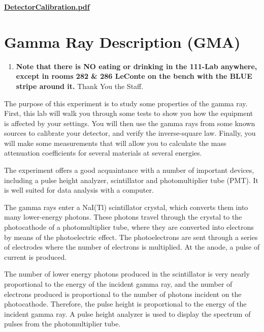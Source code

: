 \documentclass{../lab}
\begin{document}
\maketitle

\tableofcontents

\vspace{1em}

\href{http://experimentationlab.berkeley.edu/sites/default/files/images/DetectorCalibration.pdf}{\textbf{DetectorCalibration.pdf}}

\section{Gamma Ray Description (GMA)}

\begin{enumerate}
    \item \textbf{Note that there is NO eating or drinking in the 111-Lab anywhere, except in rooms 282 \& 286 LeConte on the bench with the BLUE stripe around it.} Thank You the Staff.
\end{enumerate}

The purpose of this experiment is to study some properties of the gamma ray. First, this lab will walk you through some tests to show you how the equipment is affected by your settings. You will then use the gamma rays from some known sources to calibrate your detector, and verify the inverse-square law. Finally, you will make some measurements that will allow you to calculate the mass attenuation coefficients for several materials at several energies.

The experiment offers a good acquaintance with a number of important devices, including a pulse height analyzer, scintillator and photomultiplier tube (PMT). It is well suited for data analysis with a computer.

The gamma rays enter a NaI(Tl) scintillator crystal, which converts them into many lower-energy photons. These photons travel through the crystal to the photocathode of a photomultiplier tube, where they are converted into electrons by means of the photoelectric effect. The photoelectrons are sent through a series of electrodes where the number of electrons is multiplied. At the anode, a pulse of current is produced.

The number of lower energy photons produced in the scintillator is very nearly proportional to the energy of the incident gamma ray, and the number of electrons produced is proportional to the number of photons incident on the photocathode. Therefore, the pulse height is proportional to the energy of the incident gamma ray. A pulse height analyzer is used to display the spectrum of pulses from the photomultiplier tube.
\end{document}
